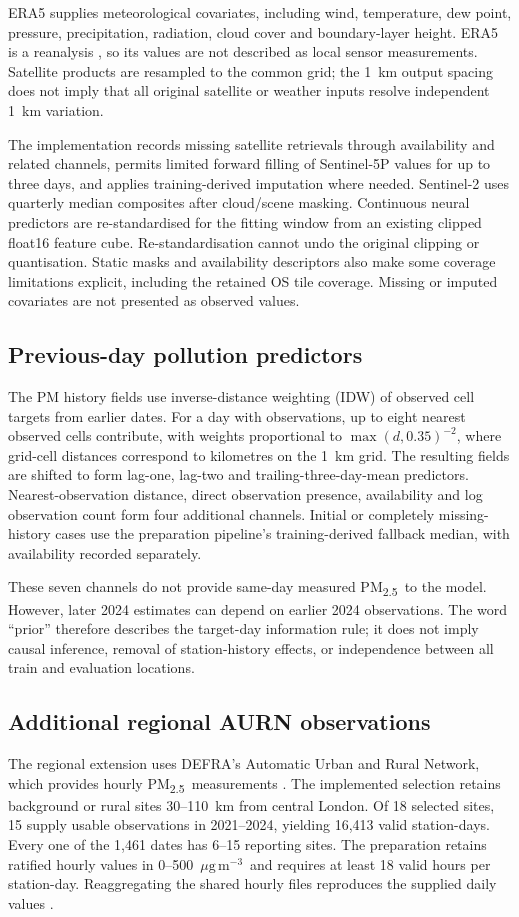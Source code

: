 \documentclass[11pt,a4paper]{article}
\newcommand{\pmfine}{PM\textsubscript{2.5}}
\newcommand{\ug}{\ensuremath{\mu\mathrm{g}\,\mathrm{m}^{-3}}}
\begin{document}
ERA5 supplies meteorological covariates, including wind, temperature, dew
point, pressure, precipitation, radiation, cloud cover and boundary-layer
height. ERA5 is a reanalysis \citep{hersbach2020}, so its values are not
described as local sensor measurements. Satellite products are resampled to
the common grid; the 1~km output spacing does not imply that all original
satellite or weather inputs resolve independent 1~km variation.

The implementation records missing satellite retrievals through availability
and related channels, permits limited forward filling of Sentinel-5P values
for up to three days, and applies training-derived imputation where needed.
Sentinel-2 uses quarterly median composites after cloud/scene masking.
Continuous neural predictors are re-standardised for the fitting window from
an existing clipped float16 feature cube. Re-standardisation cannot undo the
original clipping or quantisation. Static masks and availability descriptors
also make some coverage limitations explicit, including the retained OS tile
coverage. Missing or imputed covariates are not presented as observed values.

\subsection{Previous-day pollution predictors}
The PM history fields use inverse-distance weighting (IDW) of observed cell
targets from earlier dates. For a day with observations, up to eight nearest
observed cells contribute, with weights proportional to
$\max(d,0.35)^{-2}$, where grid-cell distances correspond to kilometres on the
1~km grid. The resulting fields are shifted to form lag-one, lag-two and
trailing-three-day-mean predictors. Nearest-observation distance, direct
observation presence, availability and log observation count form four
additional channels. Initial or completely missing-history cases use the
preparation pipeline's training-derived fallback median, with availability
recorded separately.

These seven channels do not provide same-day measured \pmfine\ to the model.
However, later 2024 estimates can depend on earlier 2024 observations. The word
``prior'' therefore describes the target-day information rule; it does not
imply causal inference, removal of station-history effects, or independence
between all train and evaluation locations.

\subsection{Additional regional AURN observations}
The regional extension uses DEFRA's Automatic Urban and Rural Network,
which provides hourly \pmfine\ measurements \citep{aurn}. The implemented
selection retains background or rural sites 30--110~km from central London.
Of 18 selected sites, 15 supply usable observations in 2021--2024, yielding
16,413 valid station-days. Every one of the 1,461 dates has 6--15 reporting
sites. The preparation retains ratified hourly values in 0--500~\ug\ and
requires at least 18 valid hours per station-day. Reaggregating the shared
hourly files reproduces the supplied daily values \citep{aitkenaurn2026}.
\end{document}
